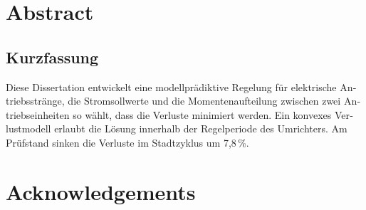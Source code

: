 \documentclass[11pt,oneside,a4paper]{report}
\begin{document}


\chapter*{Abstract}

\clearpage
\begin{otherlanguage}{ngerman}
\chapter*{Kurzfassung}
Diese Dissertation entwickelt eine modellprädiktive Regelung für elektrische Antriebsstränge,
die Stromsollwerte und die Momentenaufteilung zwischen zwei Antriebseinheiten so wählt, dass die
Verluste minimiert werden. Ein konvexes Verlustmodell erlaubt die Lösung innerhalb der
Regelperiode des Umrichters. Am Prüfstand sinken die Verluste im Stadtzyklus um 7{,}8\,\%.
\end{otherlanguage}
\clearpage
\chapter*{Acknowledgements}

\clearpage
\tableofcontents
\listoffigures
\listoftables
\clearpage
{}






\appendix




\end{document}
